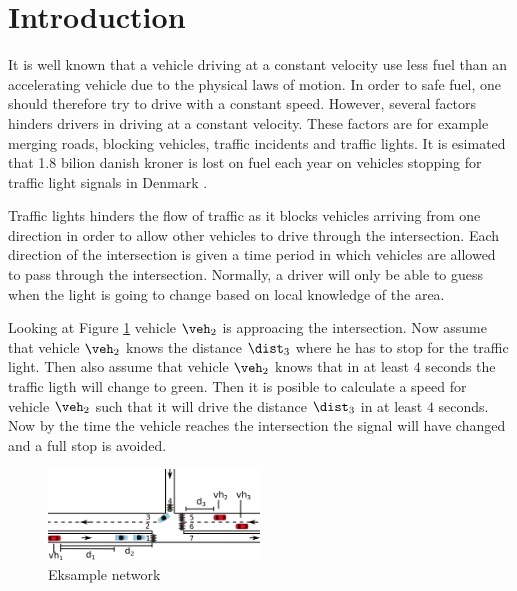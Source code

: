 \section{Introduction}

It is well known that a vehicle driving at a constant velocity use less fuel than an accelerating vehicle due to the physical laws of motion.
In order to safe fuel, one should therefore try to drive with a constant speed. 
However, several factors hinders drivers in driving at a constant velocity. 
These factors are for example merging roads, blocking vehicles, traffic incidents and traffic lights. 
It is esimated that 1.8 bilion danish kroner is lost on fuel each year on vehicles stopping for traffic light signals in Denmark \cite{Vejdir}.

Traffic lights hinders the flow of traffic as it blocks vehicles arriving from one direction in order to allow other vehicles to drive through the intersection.
Each direction of the intersection is given a time period in which vehicles are allowed to pass through the intersection. 
Normally, a driver will only be able to guess when the light is going to change based on local knowledge of the area. 

Looking at Figure \ref{fig:Introduction:network} vehicle $\veh_2$ is approacing the intersection.
Now assume that vehicle $\veh_2$ knows the distance $\dist_3$ where he has to stop for the traffic light. 
Then also assume that vehicle $\veh_2$ knows that in at least $4$ seconds the traffic ligth will change to green. 
Then it is posible to calculate a speed for vehicle $\veh_2$ such that it will drive the distance $\dist_3$ in at least $4$ seconds. 
Now by the time the vehicle reaches the intersection the signal will have changed and a full stop is avoided.
\begin{figure}[htb]
\centering
\includegraphics[width=0.5\textwidth]{images/introNetwork.png}
\caption{Eksample network}
\label{fig:Introduction:network}
\end{figure}

